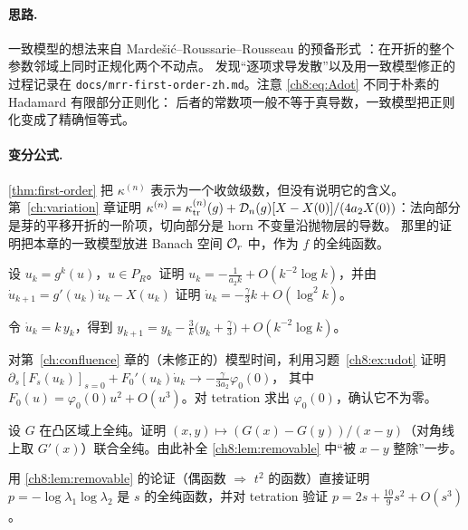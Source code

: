 \paragraph{思路.}
一致模型的想法来自 Mardešić--Roussarie--Rousseau 的预备形式 \cite{MRR2004}：在开折的整个参数邻域上同时正规化两个不动点。
发现``逐项求导发散''以及用一致模型修正的过程记录在 \texttt{docs/mrr-first-order-zh.md}。注意 \eqref{ch8:eq:Adot} 不同于朴素的 Hadamard 有限部分正则化：
后者的常数项一般不等于真导数，一致模型把正则化变成了精确恒等式。

\paragraph{变分公式.}
\cref{thm:first-order} 把 $\kappa^{(n)}$ 表示为一个收敛级数，但没有说明它的含义。第~\ref{ch:variation} 章证明
$\kappa^{(n)}=\kappa^{(n)}_{\mathrm{tr}}(g)+\mathcal D_n(g)[X-X(0)]/(4a_2X(0))$：法向部分是芽的平移开折的一阶项，切向部分是 horn 不变量沿抛物层的导数。
那里的证明把本章的一致模型放进 Banach 空间 $\mathcal O_r$ 中，作为 $f$ 的全纯函数。

\exercises

\begin{exercise}\label{ch8:ex:udot}
设 $u_k=g^k(u)$，$u\in P_R$。证明 $u_k=-\frac1{a_2k}+O(k^{-2}\log k)$，并由 $\dot u_{k+1}=g'(u_k)\dot u_k-X(u_k)$ 证明 $\dot u_k=-\frac{\gamma}3k+O(\log^2k)$。
\end{exercise}
\begin{hint}
令 $\dot u_k=k\,y_k$，得到 $y_{k+1}=y_k-\frac3k\bigl(y_k+\frac\gamma3\bigr)+O(k^{-2}\log k)$。
\end{hint}

\begin{exercise}\label{ch8:ex:divergence}
对第~\ref{ch:confluence} 章的（未修正的）模型时间，利用习题~\ref{ch8:ex:udot} 证明 $\partial_s[F_s(u_k)]_{s=0}+F_0'(u_k)\dot u_k\to-\frac{\gamma}{3a_2}\varphi_0(0)$，
其中 $F_0(u)=\varphi_0(0)u^2+O(u^3)$。对 tetration 求出 $\varphi_0(0)$，确认它不为零。
\end{exercise}

\begin{exercise}\label{ch8:ex:hadamard}
设 $G$ 在凸区域上全纯。证明 $(x,y)\mapsto(G(x)-G(y))/(x-y)$（对角线上取 $G'(x)$）联合全纯。由此补全 \cref{ch8:lem:removable} 中``被 $x-y$ 整除''一步。
\end{exercise}

\begin{exercise}\label{ch8:ex:p-holo}
用 \cref{ch8:lem:removable} 的论证（偶函数 $\Rightarrow$ $t^2$ 的函数）直接证明 $p=-\log\lambda_1\log\lambda_2$ 是 $s$ 的全纯函数，并对 tetration 验证 $p=2s+\frac{10}9s^2+O(s^3)$。
\end{exercise}

